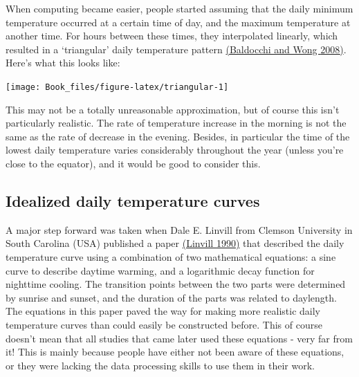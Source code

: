 \documentclass[
]{book}
\begin{document}
When computing became easier, people started assuming that the daily minimum temperature occurred at a certain time of day, and the maximum temperature at another time. For hours between these times, they interpolated linearly, which resulted in a `triangular' daily temperature pattern \href{https://link.springer.com/article/10.1007/s10584-007-9367-8}{(Baldocchi and Wong \protect\hyperlink{ref-baldocchi2008accumulated}{2008})}. Here's what this looks like:

\texttt{[image: Book\_files/figure-latex/triangular-1]}

This may not be a totally unreasonable approximation, but of course this isn't particularly realistic. The rate of temperature increase in the morning is not the same as the rate of decrease in the evening. Besides, in particular the time of the lowest daily temperature varies considerably throughout the year (unless you're close to the equator), and it would be good to consider this.

\hypertarget{idealized-daily-temperature-curves}{%
\subsection{Idealized daily temperature curves}\label{idealized-daily-temperature-curves}}

A major step forward was taken when Dale E. Linvill from Clemson University in South Carolina (USA) published a paper \href{https://journals.ashs.org/hortsci/view/journals/hortsci/25/1/article-p14.xml}{(Linvill \protect\hyperlink{ref-linvill1990calculating}{1990})} that described the daily temperature curve using a combination of two mathematical equations: a sine curve to describe daytime warming, and a logarithmic decay function for nighttime cooling. The transition points between the two parts were determined by sunrise and sunset, and the duration of the parts was related to daylength. The equations in this paper paved the way for making more realistic daily temperature curves than could easily be constructed before. This of course doesn't mean that all studies that came later used these equations - very far from it! This is mainly because people have either not been aware of these equations, or they were lacking the data processing skills to use them in their work.
\end{document}
